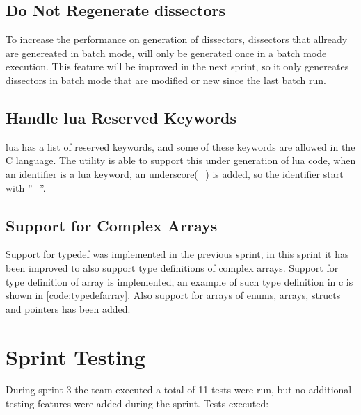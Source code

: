 \subsection{Do Not Regenerate \glspl{dissector}}
To increase the performance on generation of dissectors, dissectors that 
allready are genereated in batch mode, will only be generated once in a batch 
mode execution. This feature will be improved in the next sprint, so it only 
genereates dissectors in batch mode that are modified or new since the last 
batch run.

\subsection{Handle \Gls{lua} Reserved Keywords}
\Gls{lua} has a list of reserved keywords, and some of these keywords are allowed in 
the C language. The \gls{utility} is able to support this under generation of \Gls{lua} 
code, when an identifier is a lua keyword, an underscore(\_) is added, so the 
identifier start with ''\_''.

\subsection{Support for Complex Arrays}
Support for typedef was implemented in the previous sprint, in this sprint it 
has been improved to also support type definitions of complex arrays. Support 
for type definition of array is implemented, an example of such type 
definition in c is shown in \autoref{code:typedefarray}. Also support for 
arrays of enums, arrays, structs and pointers has been added.



\section{Sprint Testing}
During sprint 3 the team executed a total of 11 tests were run, but no additional testing features were added during the sprint. Tests executed:

